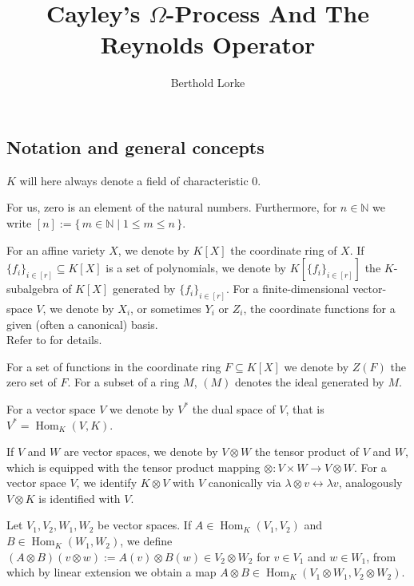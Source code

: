 \message{ !name(roughdraft.tex)}\documentclass[a4paper]{article}
\title{Cayley's $\Omega$-Process And The Reynolds Operator}
\author{Berthold Lorke}
\theoremstyle{prrt}
\begin{document}
\subsection{Notation and general concepts}

$K$ will here always denote a field of characteristic $0$.

\vspace{0.1cm}
For us, zero is an element of the natural numbers.
Furthermore, for $n \in \mathbb{N}$ we write $[n] := \{\, m \in \mathbb{N} \mid 1 \leq m \leq n \,\}$.

\vspace{0.1cm}
For an affine variety $X$, we denote by $K[X]$ the coordinate ring of $X$.
If $\{f_i\}_{i\in[r]} \subseteq K[X]$ is a set of polynomials, we denote by $K[\{f_i\}_{i\in[r]}]$ the $K$-subalgebra of $K[X]$ generated by $\{f_i\}_{i\in[r]}$.
For a finite-dimensional vector-space $V$, we denote by $X_i$, or sometimes $Y_i$ or $Z_i$, the coordinate functions for a given (often a canonical) basis.  \\
Refer to \cite[p.~1-2]{DK15} for details.

\vspace{0.1cm}
For a set of functions in the coordinate ring $F \subseteq K[X]$ we denote by $Z(F)$ the zero set of $F$. %
For a subset of a ring $M$, $(M)$ denotes the ideal generated by $M$.

\vspace{0.1cm}
For a vector space $V$ we denote by $V^\ast$ the dual space of $V$, that is \linebreak$V^\ast = \operatorname{Hom}_K(V,K)$.

\vspace{0.1cm}
If $V$ and $W$ are vector spaces, we denote by $V\otimes W$ the tensor product of $V$ and $W$, which is equipped with the tensor product mapping $\otimes \colon V\times W \rightarrow V\otimes W$.
For a vector space $V$, we identify $K \otimes V$ with $V$ canonically via $\lambda \otimes v \leftrightarrow \lambda v$, analogously $V \otimes K$ is identified with $V$.

\vspace{0.1cm}
Let $V_1,V_2,W_1,W_2$ be vector spaces.
If $A \in \operatorname{Hom}_K(V_1,V_2)$ and $B \in \operatorname{Hom}_K(W_1,W_2)$, we define $(A\otimes B)(v\otimes w) := A(v)\otimes B(w) \in V_2 \otimes W_2$ for $v \in V_1$ and $w \in W_1$, from which by linear extension we obtain a map $A \otimes B \in \operatorname{Hom}_K(V_1\otimes W_1,V_2\otimes W_2)$.
\end{document}
